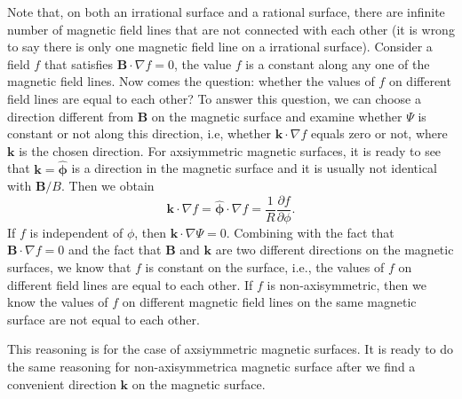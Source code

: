 \documentclass{llncs}
\newcommand{\tmmathbf}[1]{\ensuremath{\boldsymbol{#1}}}
\begin{document}
Note that, on both an irrational surface and a rational surface, there are
infinite number of magnetic field lines that are not connected with each other
(it is wrong to say there is only one magnetic field line on a irrational
surface). Consider a field $f$ that satisfies $\mathbf{B} \cdot \nabla f = 0$,
the value $f$ is a constant along any one of the magnetic field lines. Now
comes the question: whether the values of $f$ on different field lines are
equal to each other? To answer this question, we can choose a direction
different from $\mathbf{B}$ on the magnetic surface and examine whether $\Psi$
is constant or not along this direction, i.e, whether $\mathbf{k} \cdot \nabla
f$ equals zero or not, where $\mathbf{k}$ is the chosen direction. For
axsiymmetric magnetic surfaces, it is ready to see that $\mathbf{k}=
\hat{\tmmathbf{\phi}}$ is a direction in the magnetic surface and it is
usually not identical with $\mathbf{B}/ B$. Then we obtain
\begin{equation}
  \mathbf{k} \cdot \nabla f = \hat{\tmmathbf{\phi}} \cdot \nabla f =
  \frac{1}{R}  \frac{\partial f}{\partial \phi} .
\end{equation}
If $f$ is independent of $\phi$, then $\mathbf{k} \cdot \nabla \Psi = 0$.
Combining with the fact that $\mathbf{B} \cdot \nabla f = 0$ and the fact that
$\mathbf{B}$ and $\mathbf{k}$ are two different directions on the magnetic
surfaces, we know that $f$ is constant on the surface, i.e., the values of $f$
on different field lines are equal to each other. If $f$ is non-axisymmetric,
then we know the values of $f$ on different magnetic field lines on the same
magnetic surface are not equal to each other.

This reasoning is for the case of axsiymmetric magnetic surfaces. It is ready
to do the same reasoning for non-axisymmetrica magnetic surface after we find
a convenient direction $\mathbf{k}$ on the magnetic surface.
\end{document}
